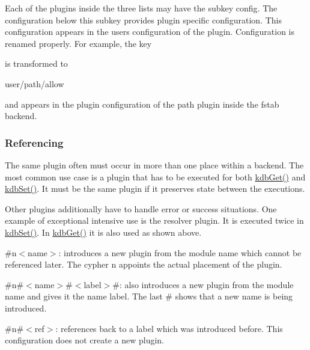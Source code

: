 Each of the plugins inside the three lists may have the subkey {\ttfamily config}. The configuration below this subkey provides plugin specific configuration. This configuration appears in the user\textquotesingle{}s configuration of the plugin. Configuration is renamed properly. For example, the key 


is transformed to \begin{DoxyVerb}    user/path/allow
\end{DoxyVerb}


and appears in the plugin configuration of the path plugin inside the fstab backend.

\subsubsection*{Referencing}

The same plugin often must occur in more than one place within a backend. The most common use case is a plugin that has to be executed for both {\ttfamily \hyperlink{group__kdb_ga28e385fd9cb7ccfe0b2f1ed2f62453a1}{kdb\+Get()}} and {\ttfamily \hyperlink{group__kdb_ga11436b058408f83d303ca5e996832bcf}{kdb\+Set()}}. It must be the same plugin if it preserves state between the executions.

Other plugins additionally have to handle error or success situations. One example of exceptional intensive use is the resolver plugin. It is executed twice in {\ttfamily \hyperlink{group__kdb_ga11436b058408f83d303ca5e996832bcf}{kdb\+Set()}}. In {\ttfamily \hyperlink{group__kdb_ga28e385fd9cb7ccfe0b2f1ed2f62453a1}{kdb\+Get()}} it is also used as shown above.


\begin{DoxyItemize}
\item {\ttfamily \#n$<$name$>$}\+: introduces a new plugin from the module {\ttfamily name} which cannot be referenced later. The cypher {\ttfamily n} appoints the actual placement of the plugin.
\item {\ttfamily \#n\#$<$name$>$\#$<$label$>$\#}\+: also introduces a new plugin from the module {\ttfamily name} and gives it the name {\ttfamily label}. The last {\ttfamily \#} shows that a new name is being introduced.
\item {\ttfamily \#n\#$<$ref$>$}\+: references back to a label which was introduced before. This configuration does not create a new plugin.
\end{DoxyItemize}

